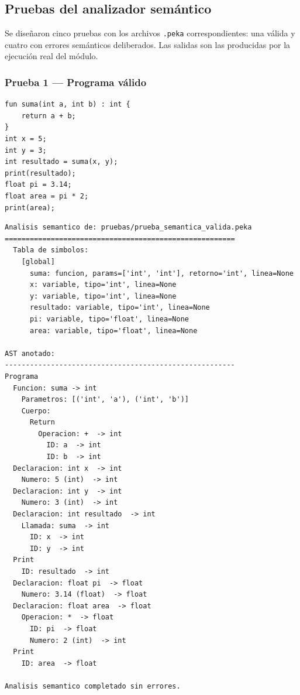 \documentclass[12pt]{article}
\begin{document}
\subsection{Pruebas del analizador semántico}

Se diseñaron cinco pruebas con los archivos \texttt{.peka}
correspondientes: una válida y cuatro con errores semánticos
deliberados. Las salidas son las producidas por la ejecución
real del módulo.

\subsubsection{Prueba 1 — Programa válido}

\begin{lstlisting}[caption={prueba\_semantica\_valida.peka}]
fun suma(int a, int b) : int {
    return a + b;
}
int x = 5;
int y = 3;
int resultado = suma(x, y);
print(resultado);
float pi = 3.14;
float area = pi * 2;
print(area);
\end{lstlisting}

\begin{lstlisting}[caption={Salida — Prueba 1}]
Analisis semantico de: pruebas/prueba_semantica_valida.peka
=======================================================
  Tabla de simbolos:
    [global]
      suma: funcion, params=['int', 'int'], retorno='int', linea=None
      x: variable, tipo='int', linea=None
      y: variable, tipo='int', linea=None
      resultado: variable, tipo='int', linea=None
      pi: variable, tipo='float', linea=None
      area: variable, tipo='float', linea=None

AST anotado:
-------------------------------------------------------
Programa
  Funcion: suma -> int
    Parametros: [('int', 'a'), ('int', 'b')]
    Cuerpo:
      Return
        Operacion: +  -> int
          ID: a  -> int
          ID: b  -> int
  Declaracion: int x  -> int
    Numero: 5 (int)  -> int
  Declaracion: int y  -> int
    Numero: 3 (int)  -> int
  Declaracion: int resultado  -> int
    Llamada: suma  -> int
      ID: x  -> int
      ID: y  -> int
  Print
    ID: resultado  -> int
  Declaracion: float pi  -> float
    Numero: 3.14 (float)  -> float
  Declaracion: float area  -> float
    Operacion: *  -> float
      ID: pi  -> float
      Numero: 2 (int)  -> int
  Print
    ID: area  -> float

Analisis semantico completado sin errores.
\end{lstlisting}
\end{document}
